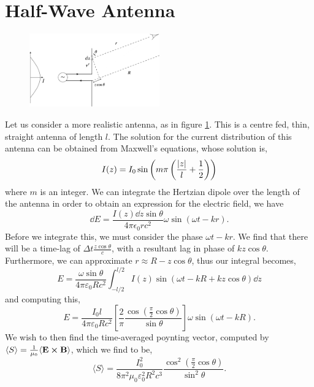 \documentclass{book}
\begin{document}
\section{Half-Wave Antenna}
\begin{figure}
	\centering
	\includegraphics[width=0.5\textwidth]{2.6.png}
	\caption{}
	\label{fig:2.6}
\end{figure}
Let us consider a more realistic antenna, as in figure \ref{fig:2.6}. This is a centre fed, thin, straight antenna of length $l$. The solution for the current distribution of this antenna can be obtained from Maxwell's equations, whose solution is,
\begin{equation}
	I(z) = I_0 \sin\left(m\pi \left(\frac{\abs{z}}{l} + \frac{1}{2}\right)\right)
\end{equation}
where $m$ is an integer. We can integrate the Hertzian dipole over the length of the antenna in order to obtain an expression for the electric field, we have
\begin{equation}
	\dd E = \frac{I(z) \dd{z}\sin\theta}{4\pi \epsilon_0 r c^2}\omega \sin(\omega t - kr).
\end{equation}
Before we integrate this, we must consider the phase $\omega t - kr$. We find that there will be a time-lag of $\Delta t \frac{z\cos\theta}{c}$, with a resultant lag in phase of $kz\cos\theta$. Furthermore, we can approximate $r \approx R - z\cos\theta$, thus our integral becomes,
\begin{equation}
	E = \frac{\omega \sin\theta}{4\pi \varepsilon_0Rc^2}\int_{-l/2}^{l/2}I(z) \sin\left(\omega t - kR + kz\cos\theta\right)\dd{z}
\end{equation}
and computing this,
\begin{equation}
	E = \frac{I_0 l}{4\pi \varepsilon_0Rc^2}\left[\frac{2}{\pi}\frac{\cos\left(\frac{\pi}{2}\cos\theta\right)}{\sin\theta}\right]\omega \sin\left(\omega t - kR\right).
\end{equation}
We wish to then find the time-averaged poynting vector, computed by $\langle S \rangle = \frac{1}{\mu_0}\langle \vb{E}\cross\vb{B}\rangle$, which we find to be,
\begin{equation}
	\langle S \rangle = \frac{I_0^2}{8\pi^2 \mu_0\varepsilon_0^2R^2c^3}\frac{\cos^2\left(\frac{\pi}{2}\cos\theta\right)}{\sin^2\theta}.
\end{equation}
\end{document}
